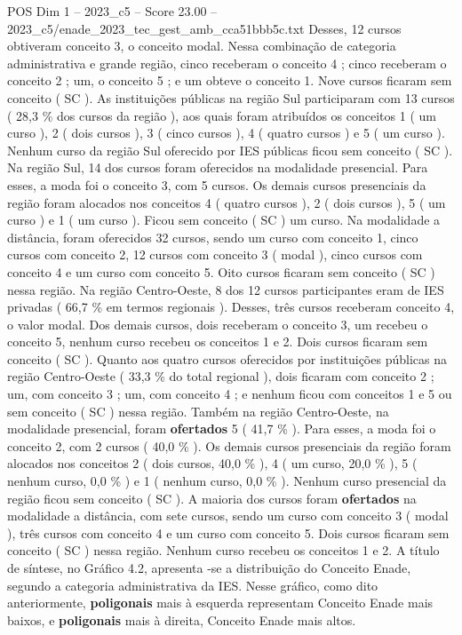 \begin{textsample}{POS Dim 1 – 2023\_c5 – Score 23.00 – 2023\_c5/enade\_2023\_tec\_gest\_amb\_cca51bbb5c.txt}
Desses, 12 cursos obtiveram conceito 3, o conceito modal.
Nessa combinação de categoria administrativa e grande região, cinco receberam o conceito 4 ; cinco receberam o conceito 2 ; um, o conceito 5 ; e um obteve o conceito 1.
Nove cursos ficaram sem conceito ( SC ).
As instituições públicas na região Sul participaram com 13 cursos ( 28,3 \% dos cursos da região ), aos quais foram atribuídos os conceitos 1 ( um curso ), 2 ( dois cursos ), 3 ( cinco cursos ), 4 ( quatro cursos ) e 5 ( um curso ).
Nenhum curso da região Sul oferecido por IES públicas ficou sem conceito ( SC ).
Na região Sul, 14 dos cursos foram oferecidos na modalidade presencial.
Para esses, a moda foi o conceito 3, com 5 cursos.
Os demais cursos presenciais da região foram alocados nos conceitos 4 ( quatro cursos ), 2 ( dois cursos ), 5 ( um curso ) e 1 ( um curso ).
Ficou sem conceito ( SC ) um curso.
Na modalidade a distância, foram oferecidos 32 cursos, sendo um curso com conceito 1, cinco cursos com conceito 2, 12 cursos com conceito 3 ( modal ), cinco cursos com conceito 4 e um curso com conceito 5.
Oito cursos ficaram sem conceito ( SC ) nessa região.
Na região Centro-Oeste, 8 dos 12 cursos participantes eram de IES privadas ( 66,7 \% em termos regionais ).
Desses, três cursos receberam conceito 4, o valor modal.
Dos demais cursos, dois receberam o conceito 3, um recebeu o conceito 5, nenhum curso recebeu os conceitos 1 e 2.
Dois cursos ficaram sem conceito ( SC ).
Quanto aos quatro cursos oferecidos por instituições públicas na região Centro-Oeste ( 33,3 \% do total regional ), dois ficaram com conceito 2 ; um, com conceito 3 ; um, com conceito 4 ; e nenhum ficou com conceitos 1 e 5 ou sem conceito ( SC ) nessa região.
Também na região Centro-Oeste, na modalidade presencial, foram \textbf{ofertados} 5 ( 41,7 \% ).
Para esses, a moda foi o conceito 2, com 2 cursos ( 40,0 \% ).
Os demais cursos presenciais da região foram alocados nos conceitos 2 ( dois cursos, 40,0 \% ), 4 ( um curso, 20,0 \% ), 5 ( nenhum curso, 0,0 \% ) e 1 ( nenhum curso, 0,0 \% ).
Nenhum curso presencial da região ficou sem conceito ( SC ).
A maioria dos cursos foram \textbf{ofertados} na modalidade a distância, com sete cursos, sendo um curso com conceito 3 ( modal ), três cursos com conceito 4 e um curso com conceito 5.
Dois cursos ficaram sem conceito ( SC ) nessa região.
Nenhum curso recebeu os conceitos 1 e 2.
A título de síntese, no Gráfico 4.2, apresenta -se a distribuição do Conceito Enade, segundo a categoria administrativa da IES.
Nesse gráfico, como dito anteriormente, \textbf{poligonais} mais à esquerda representam Conceito Enade mais baixos, e \textbf{poligonais} mais à direita, Conceito Enade mais altos.

\end{textsample}
